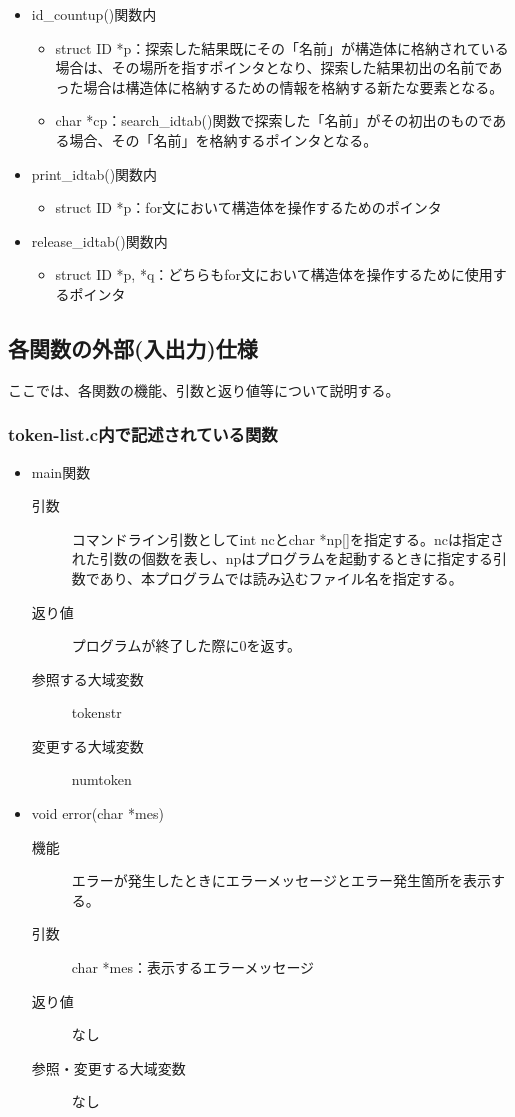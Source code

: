 \documentclass{jarticle}
\begin{document}
\begin{itemize}
\begin{itemize}
\begin{itemize}
      \item id\_countup()関数内
      \begin{itemize}
        \item struct ID
        *p：探索した結果既にその「名前」が構造体に格納されている場合は、その場所を指すポインタとなり、探索した結果初出の名前であった場合は構造体に格納するための情報を格納する新たな要素となる。
        \item char *cp：search\_idtab()関数で探索した「名前」がその初出のものである場合、その「名前」を格納するポインタとなる。
      \end{itemize}
      \item print\_idtab()関数内
      \begin{itemize}
        \item struct ID *p：for文において構造体を操作するためのポインタ
      \end{itemize}
      \item release\_idtab()関数内
      \begin{itemize}
        \item struct ID *p, *q：どちらもfor文において構造体を操作するために使用するポインタ
      \end{itemize}
    \end{itemize}
  \end{itemize}
\end{itemize}
\subsection{各関数の外部(入出力)仕様}
ここでは、各関数の機能、引数と返り値等について説明する。
\subsubsection{token-list.c内で記述されている関数}
\begin{itemize}
  \item main関数
  \begin{description}
\item[引数]コマンドライン引数としてint ncとchar
*np[]を指定する。ncは指定された引数の個数を表し、npはプログラムを起動するときに指定する引数であり、本プログラムでは読み込むファイル名を指定する。
\item[返り値]プログラムが終了した際に0を返す。
\item[参照する大域変数]tokenstr
\item[変更する大域変数]numtoken
\end{description}
\item void error(char *mes)
\begin{description}
\item[機能]エラーが発生したときにエラーメッセージとエラー発生箇所を表示する。
\item[引数]char *mes：表示するエラーメッセージ
\item[返り値]なし
\item[参照・変更する大域変数]なし
\end{description}
\end{itemize}
\end{document}
